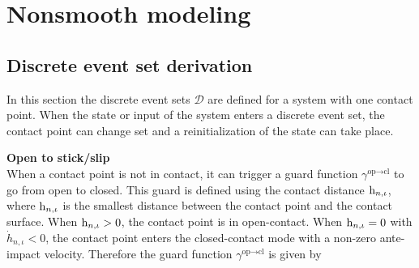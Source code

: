 \documentclass[../DC2017114Bouma.tex]{subfiles}
\begin{document}

\cleartooddpage
\pagestyle{appendix}
\chapter{Nonsmooth modeling}\label{app:nonsmooth}
\section{Discrete event set derivation}\label{app:hybriddisc}
In this section the discrete event sets $\mathcal{D}$ are defined for a system with one contact point. When the state or input of the system enters a discrete event set, the contact point can change set and a reinitialization of the state can take place.

\textbf{Open to stick/slip}\\
When a contact point is not in contact, it can trigger a guard function $\gamma^{\text{op}\rightarrow\text{cl}}$ to go from open to closed. This guard is defined using the contact distance $\mathrm{h}_{n,\iota}$, where $\mathrm{h}_{n,\iota}$ is the smallest distance between the contact point and the contact surface. When $\mathrm{h}_{n,\iota}>0$, the contact point is in open-contact. When $\mathrm{h}_{n,\iota}=0$ with $\dot{h}_{n,\iota}<0$, the contact point enters the closed-contact mode with a non-zero ante-impact velocity. Therefore the guard function $\gamma^{\text{op}\rightarrow\text{cl}}$ is given by
\end{document}
